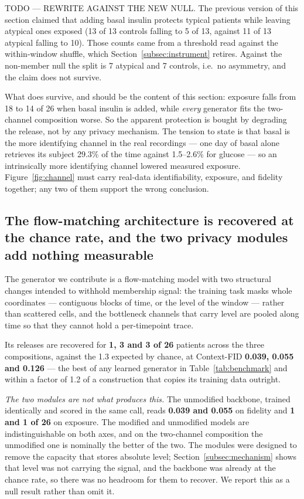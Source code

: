 \documentclass[pdflatex,sn-nature]{sn-jnl}
\theoremstyle{thmstyleone}
\begin{document}
TODO --- REWRITE AGAINST THE NEW NULL. The previous version of this section
claimed that adding basal insulin protects typical patients while leaving
atypical ones exposed (13 of 13 controls falling to 5 of 13, against 11 of 13
atypical falling to 10). Those counts came from a threshold read against the
within-window shuffle, which Section~\ref{subsec:instrument} retires. Against
the non-member null the split is 7 atypical and 7 controls, i.e.\ no asymmetry,
and the claim does not survive.

What does survive, and should be the content of this section: exposure falls
from 18 to 14 of 26 when basal insulin is added, while \emph{every} generator
fits the two-channel composition worse. So the apparent protection is bought by
degrading the release, not by any privacy mechanism. The tension to state is
that basal is the more identifying channel in the real recordings --- one day
of basal alone retrieves its subject 29.3\% of the time against 1.5--2.6\% for
glucose --- so an intrinsically more identifying channel lowered measured
exposure. Figure~\ref{fig:channel} must carry real-data identifiability,
exposure, and fidelity together; any two of them support the wrong conclusion.

\subsection{The flow-matching architecture is recovered at the chance rate, and
the two privacy modules add nothing measurable}\label{subsec:modules}

The generator we contribute is a flow-matching model with two structural
changes intended to withhold membership signal: the training task masks whole
coordinates --- contiguous blocks of time, or the level of the window --- rather
than scattered cells, and the bottleneck channels that carry level are pooled
along time so that they cannot hold a per-timepoint trace.

Its releases are recovered for \textbf{1, 3 and 3 of 26} patients across the
three compositions, against the 1.3 expected by chance, at Context-FID
\textbf{0.039, 0.055 and 0.126} --- the best of any learned generator in
Table~\ref{tab:benchmark} and within a factor of 1.2 of a construction that
copies its training data outright.

\emph{The two modules are not what produces this.} The unmodified backbone,
trained identically and scored in the same call, reads \textbf{0.039 and 0.055}
on fidelity and \textbf{1 and 1 of 26} on exposure. The modified and unmodified
models are indistinguishable on both axes, and on the two-channel composition
the unmodified one is nominally the better of the two. The modules were designed
to remove the capacity that stores absolute level; Section~\ref{subsec:mechanism}
shows that level was not carrying the signal, and the backbone was already at
the chance rate, so there was no headroom for them to recover. We report this as
a null result rather than omit it.
\end{document}

